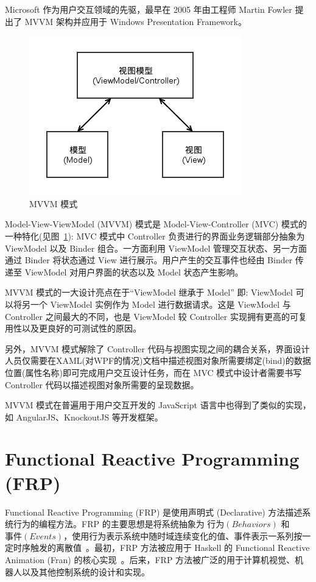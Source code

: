 Microsoft 作为用户交互领域的先驱，最早在 2005 年由工程师 Martin Fowler 提出了 MVVM 架构并应用于 Windows Presentation Framework。

\begin{figure}[!h]
\begin{center}
\includegraphics[scale=0.7]{figures/MVVMOverview.png}
\caption{MVVM 模式\label{MVVMOverview}}
\end{center}
\end{figure}

Model-View-ViewModel (MVVM) 模式是 Model-View-Controller (MVC) 模式的一种特化(见图~\ref{MVVMOverview}): MVC 模式中 Controller 负责进行的界面业务逻辑部分抽象为 ViewModel 以及 Binder 组合。一方面利用 ViewModel 管理交互状态、另一方面通过 Binder 将状态通过 View 进行展示。用户产生的交互事件也经由 Binder 传递至 ViewModel 对用户界面的状态以及 Model 状态产生影响。

MVVM 模式的一大设计亮点在于“ViewModel 继承于 Model” 即: ViewModel 可以将另一个 ViewModel 实例作为 Model 进行数据请求。这是 ViewModel 与 Controller 之间最大的不同，也是 ViewModel 较 Controller 实现拥有更高的可复用性以及更良好的可测试性的原因。

另外，MVVM 模式解除了 Controller 代码与视图实现之间的耦合关系，界面设计人员仅需要在XAML(对WPF的情况)文档中描述视图对象所需要绑定(bind)的数据位置(属性名称)即可完成用户交互设计任务，而在 MVC 模式中设计者需要书写 Controller 代码以描述视图对象所需要的呈现数据。

MVVM 模式在普遍用于用户交互开发的 JavaScript 语言中也得到了类似的实现，如 AngularJS、KnockoutJS 等开发框架。

\section{Functional Reactive Programming (FRP)}

Functional Reactive Programming (FRP) 是使用声明式 (Declarative) 方法描述系统行为的编程方法。FRP 的主要思想是将系统抽象为 $行为(Behaviors)$ 和 $事件(Events)$，使用行为表示系统中随时域连续变化的值、事件表示一系列按一定时序触发的离散值~\cite{Wan:2000:FRP:358438.349331}。最初，FRP 方法被应用于 Haskell 的 Functional Reactive Animation (Fran) 的核心实现~\cite{Elliott:1997:FRA:258949.258973}。后来，FRP 方法被广泛的用于计算机视觉、机器人以及其他控制系统的设计和实现。

